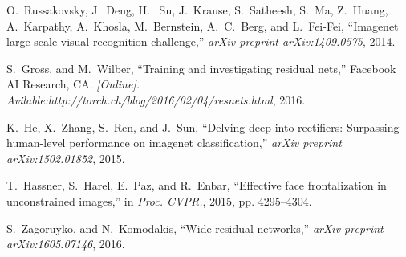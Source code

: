 \documentclass[journal]{IEEEtran}
\begin{document}
\begin{thebibliography}{1}
O.~Russakovsky, J.~Deng, H. ~Su, J.~Krause, S.~Satheesh, S.~Ma, Z.~Huang, A.~Karpathy, A.~Khosla, M.~Bernstein, A.~C.~Berg, and L.~Fei-Fei, ``Imagenet  large  scale  visual  recognition  challenge,'' \emph{arXiv preprint arXiv:1409.0575}, 2014.

S.~Gross, and M.~Wilber, ``Training and investigating residual nets,'' Facebook AI Research, CA. \emph{[Online]. Avilable:http://torch.ch/blog/2016/02/04/resnets.html}, 2016.

K.~He, X.~Zhang, S.~Ren, and J.~Sun, ``Delving deep into rectifiers: Surpassing human-level performance on imagenet classification,'' \emph{arXiv preprint arXiv:1502.01852}, 2015. 

T.~Hassner, S.~Harel, E.~Paz, and R.~Enbar, ``Effective face frontalization in unconstrained images,'' in
  \emph{Proc. CVPR.}, 2015, pp. 4295--4304.

S.~Zagoruyko, and N.~Komodakis, ``Wide residual networks,'' \emph{arXiv preprint arXiv:1605.07146}, 2016. 




\end{thebibliography}
\end{document}
